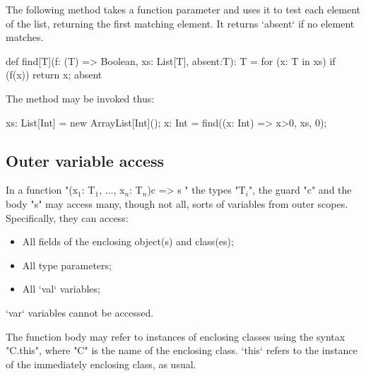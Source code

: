 \begin{example}
The following method takes a function parameter and uses it to
test each element of the list, returning the first matching
element.  It returns \xcd`absent` if no element matches.

\begin{xten}

def find[T](f: (T) => Boolean, xs: List[T], absent:T): T = {
  for (x: T in xs)
    if (f(x)) return x;
  absent
  }
\end{xten}

The method may be invoked thus:
\begin{xten}
xs: List[Int] = new ArrayList[Int]();
x: Int = find((x: Int) => x>0, xs, 0);
\end{xten}

\end{example}



\subsection{Outer variable access}

In a function
\xcdmath"(x$_1$: T$_1$, $\dots$, x$_n$: T$_n$){c} => { s }"
the types \xcdmath"T$_i$", the guard \xcd"c" and the body \xcd"s"
may access many, though not all, sorts of variables from outer scopes.  
Specifically, they can access: 
\begin{itemize}
\item All fields of the enclosing object(s) and class(es);
\item All type parameters;
\item All \xcd`val` variables;
\end{itemize}
\noindent
\xcd`var` variables cannot be accessed.


The function body may refer to instances of enclosing classes using
the syntax \xcd"C.this", where \xcd"C" is the name of the
enclosing class.  \xcd`this` refers to the instance of the immediately
enclosing class, as usual.


